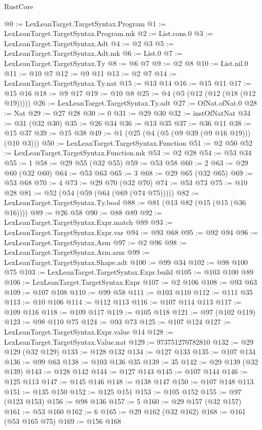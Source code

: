 \begin{lexlean}{RustCore}
\begin{coremodule}
@0 := LexLeanTarget.TargetSyntax.Program
@1 := LexLeanTarget.TargetSyntax.Program.mk
@2 := List.cons.{0}
@3 := LexLeanTarget.TargetSyntax.Adt
@4 := @2 @3
@5 := LexLeanTarget.TargetSyntax.Adt.mk
@6 := List.{0}
@7 := LexLeanTarget.TargetSyntax.Ty
@8 := @6 @7
@9 := @2 @8
@10 := List.nil.{0}
@11 := @10 @7
@12 := @9 @11
@13 := @2 @7
@14 := LexLeanTarget.TargetSyntax.Ty.nat
@15 := @13 @14
@16 := @15 @11
@17 := @15 @16
@18 := @9 @17
@19 := @10 @8
@25 := @4 (@5 (@12 (@12 (@18 (@12 @19)))))
@26 := LexLeanTarget.TargetSyntax.Ty.adt
@27 := OfNat.ofNat.{0}
@28 := Nat
@29 := @27 @28
@30 := 0
@31 := @29 @30
@32 := instOfNatNat
@34 := @31 (@32 @30)
@35 := @26 @34
@36 := @13 @35
@37 := @36 @11
@38 := @15 @37
@39 := @15 @38
@49 := @1 (@25 (@4 (@5 (@9 @39 (@9 @16 @19))) (@10 @3)))
@50 := LexLeanTarget.TargetSyntax.Function
@51 := @2 @50
@52 := LexLeanTarget.TargetSyntax.Function.mk
@53 := @2 @28
@54 := @53 @34
@55 := 1
@58 := @29 @55 (@32 @55)
@59 := @53 @58
@60 := 2
@63 := @29 @60 (@32 @60)
@64 := @53 @63
@65 := 3
@68 := @29 @65 (@32 @65)
@69 := @53 @68
@70 := 4
@73 := @29 @70 (@32 @70)
@74 := @53 @73
@75 := @10 @28
@81 := @52 (@54 (@59 (@64 (@69 (@74 @75)))))
@82 := LexLeanTarget.TargetSyntax.Ty.bool
@88 := @81 (@13 @82 (@15 (@15 (@36 @16))))
@89 := @26 @58
@90 := @88 @89
@92 := LexLeanTarget.TargetSyntax.Expr.match @89
@93 := LexLeanTarget.TargetSyntax.Expr.var
@94 := @93 @68
@95 := @92 @94
@96 := LexLeanTarget.TargetSyntax.Arm
@97 := @2 @96
@98 := LexLeanTarget.TargetSyntax.Arm.arm
@99 := LexLeanTarget.TargetSyntax.Shape.adt
@100 := @99 @34
@102 := @98 @100 @75
@103 := LexLeanTarget.TargetSyntax.Expr.build
@105 := @103 @100 @89
@106 := LexLeanTarget.TargetSyntax.Expr
@107 := @2 @106
@108 := @93 @63
@109 := @107 @108
@110 := @99 @58
@111 := @103 @110
@112 := @111 @35
@113 := @10 @106
@114 := @112 @113
@116 := @107 @114 @113
@117 := @109 @116
@118 := @109 @117
@119 := @105 @118
@121 := @97 (@102 @119)
@123 := @98 @110 @75
@124 := @93 @73
@125 := @107 @124
@127 := LexLeanTarget.TargetSyntax.Expr.value @14
@128 := LexLeanTarget.TargetSyntax.Value.nat
@129 := 973751270782810
@132 := @29 @129 (@32 @129)
@133 := @128 @132
@134 := @127 @133
@135 := @107 @134
@136 := @99 @63
@138 := @103 @136 @35
@139 := 35
@142 := @29 @139 (@32 @139)
@143 := @128 @142
@144 := @127 @143
@145 := @107 @144
@146 := @125 @113
@147 := @145 @146
@148 := @138 @147
@150 := @107 @148 @113
@151 := @135 @150
@152 := @125 @151
@153 := @105 @152
@155 := @97 (@123 @153)
@156 := @98 @136
@157 := 5
@160 := @29 @157 (@32 @157)
@161 := @53 @160
@162 := 6
@165 := @29 @162 (@32 @162)
@168 := @161 (@53 @165 @75)
@169 := @156 @168

\end{coremodule}
\end{lexlean}
